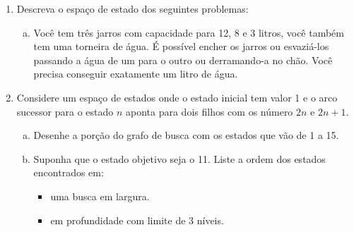 \documentclass[12pt]{article}
\begin{document}
\begin{enumerate}
\item Descreva o espaço de estado dos seguintes problemas:
\begin{enumerate}[a)]



\item Você tem três jarros com capacidade para 12, 8 e 3 litros, você também tem uma torneira de água. É possível encher os jarros ou esvaziá-los passando a água de um para o outro ou derramando-a no chão. Você precisa conseguir exatamente um litro de água.

\end{enumerate}



\break

\item Considere um espaço de estados onde o estado inicial tem valor 1 e o arco sucessor para o estado $n$ aponta para dois filhos com os número $2n$ e $2n+1$.
\begin{enumerate}[a)]

\item Desenhe a porção do grafo de busca com os estados que vão de 1 a 15.

\item Suponha que o estado objetivo seja o 11. Liste a ordem dos estados encontrados em:

\begin{itemize}

\item uma busca em largura.

\item em profundidade com limite de 3 níveis.

\end{itemize}

\end{enumerate}





\break



\end{enumerate}
\end{document}
